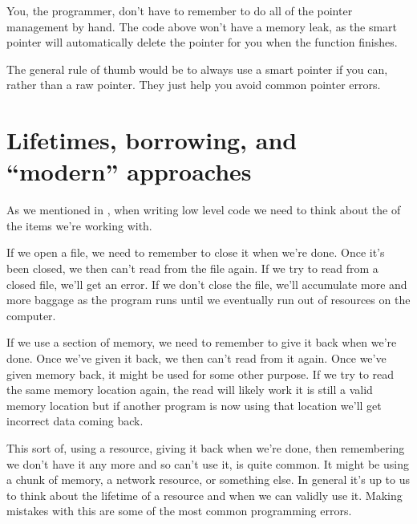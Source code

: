 \documentclass[letterpaper,10pt,british]{sphinxmanual}
\begin{document}
\sphinxAtStartPar
You, the programmer, don’t have to remember to do all of the pointer management by hand. The code above won’t have a memory leak, as the smart pointer will automatically delete the pointer for you when the function finishes.

\sphinxAtStartPar
The general rule of thumb would be to always use a smart pointer if you can, rather than a raw pointer. They just help you avoid common pointer errors.

\sphinxstepscope


\section{Lifetimes, borrowing, and “modern” approaches}
\label{\detokenize{chapters/programming_fundamentals/lifetimes:lifetimes-borrowing-and-modern-approaches}}\label{\detokenize{chapters/programming_fundamentals/lifetimes:lifetimes}}\label{\detokenize{chapters/programming_fundamentals/lifetimes::doc}}
\sphinxAtStartPar
As we mentioned in {\hyperref[\detokenize{chapters/programming_fundamentals/pointers:pointers}]{}}, when writing low level code we need to think about the  of the items we’re working with.

\sphinxAtStartPar
If we open a file, we need to remember to close it when we’re done. Once it’s been closed, we then can’t read from the file again. If we try to read from a closed file, we’ll get an error. If we don’t close the file, we’ll accumulate more and more baggage as the program runs until we eventually run out of resources on the computer.

\sphinxAtStartPar
If we use a section of memory, we need to remember to give it back when we’re done. Once we’ve given it back, we then can’t read from it again. Once we’ve given memory back, it might be used for some other purpose. If we try to read the same memory location again, the read will likely work \sphinxhyphen{} it is still a valid memory location \sphinxhyphen{} but if another program is now using that location we’ll get incorrect data coming back.

\sphinxAtStartPar
This sort of, using a resource, giving it back when we’re done, then remembering we don’t have it any more and so can’t use it, is quite common. It might be using a chunk of memory, a network resource, or something else. In general it’s up to us to think about the lifetime of a resource and when we can validly use it. Making mistakes with this are some of the most common programming errors.
\end{document}
